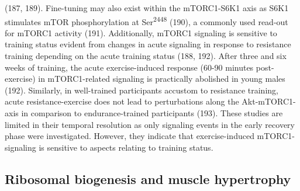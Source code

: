 \documentclass[twoside,10pt]{gihclass} %
\begin{document}
(187, 189).
Fine-tuning may also exist within the mTORC1-S6K1 axis as S6K1 stimulates mTOR phosphorylation at Ser\textsuperscript{2448}
(190),
a commonly used read-out for mTORC1 activity
(191).
Additionally, mTORC1 signaling is sensitive to training status evident from changes in acute signaling in response to resistance training depending on the acute training status
(188, 192).
After three and six weeks of training, the acute exercise-induced response (60-90 minutes post-exercise) in mTORC1-related signaling is practically abolished in young males
(192).
Similarly, in well-trained participants accustom to resistance training, acute resistance-exercise does not lead to perturbations along the Akt-mTORC1-axis in comparison to endurance-trained participants
(193).
These studies are limited in their temporal resolution as only signaling events in the early recovery phase were investigated.
However, they indicate that exercise-induced mTORC1-signaling is sensitive to aspects relating to training status.

\hypertarget{ribosomal-biogenesis-and-muscle-hypertrophy}{%
\subsection{Ribosomal biogenesis and muscle hypertrophy}\label{ribosomal-biogenesis-and-muscle-hypertrophy}}
\end{document}
